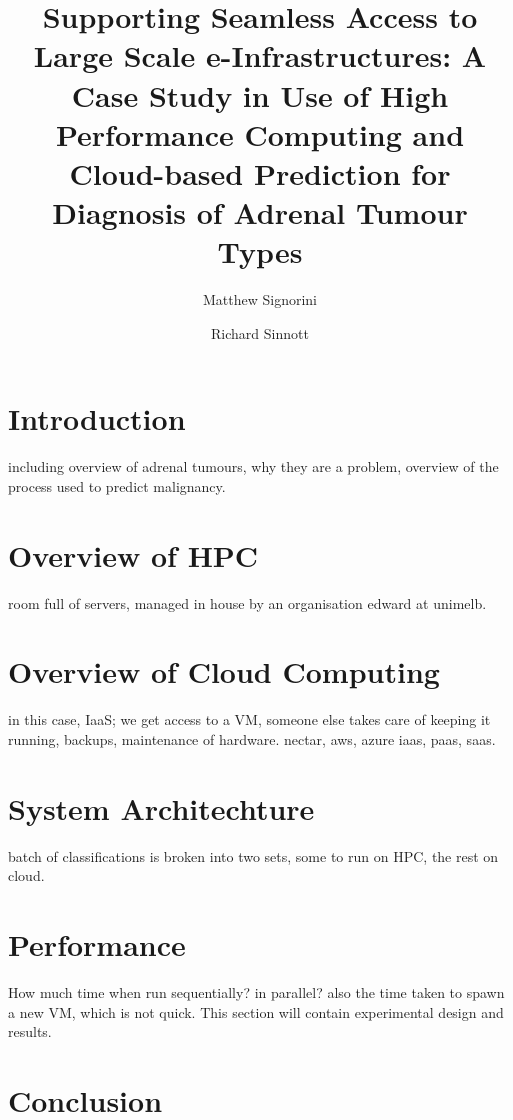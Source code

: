 \documentclass[a4paper]{article}
\title{Supporting Seamless Access to Large Scale e-Infrastructures: A Case
    Study in Use of High Performance Computing and Cloud-based Prediction
    for Diagnosis of Adrenal Tumour Types}
\author{Matthew Signorini \and Richard Sinnott}
\begin{document}
\maketitle

\begin{abstract}
    \blindtext
\end{abstract}

\section{Introduction}
including overview of adrenal tumours, why they are a problem, overview of
the process used to predict malignancy.

\section{Overview of HPC}
room full of servers, managed in house by an organisation
edward at unimelb.

\section{Overview of Cloud Computing}
in this case, IaaS; we get access to a VM, someone else takes care of
keeping it running, backups, maintenance of hardware.
nectar, aws, azure
iaas, paas, saas.

\section{System Architechture}
batch of classifications is broken into two sets, some to run on HPC, the 
rest on cloud.

\section{Performance}
How much time when run sequentially? in parallel? also the time taken to
spawn a new VM, which is not quick. This section will contain experimental
design and results.

\section{Conclusion}
\end{document}

